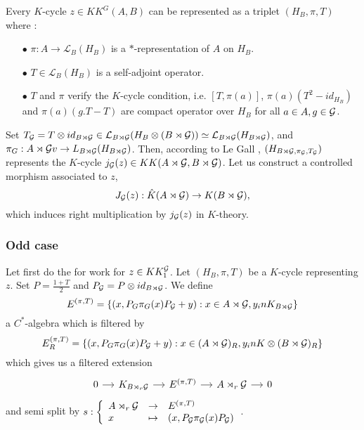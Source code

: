 Every $K$-cycle $z\in KK^G(A,B)$ can be represented as a triplet $(H_B, \pi, T)$ where :
\begin{itemize}
\item[$\bullet$]$\pi : A\rightarrow \mathcal L_B(H_B)$ is a $*$-representation of $A$ on $H_B$.
\item[$\bullet$]$T\in \mathcal L_B(H_B)$ is a self-adjoint operator.
\item[$\bullet$] $T$ and $\pi$ verify the $K$-cycle condition, i.e. $[T,\pi(a)]$, $\pi(a)(T^2-id_{H_B})$ and $\pi(a)(g.T-T)$ are compact operator over $H_B$ for all $a\in A, g\in \mathcal G$.\\
\end{itemize}

Set $T_\mathcal G= T\otimes id_{B\rtimes \mathcal G}\in \mathcal L_{B\rtimes \mathcal G}(H_B\otimes (B\rtimes \mathcal G))\simeq \mathcal L_{B\rtimes \mathcal G}(H_{B\rtimes\mathcal G})$, and $\pi_G: A\rtimes \mathcal G v\rightarrow L_{B\rtimes \mathcal G}(H_{B\rtimes\mathcal G})$. Then, according to Le Gall \cite{LeGall}, $(H_{B\rtimes\mathcal G, \pi_\mathcal G, T_\mathcal G})$ represents the $K$-cycle $j_\mathcal G(z)\in KK(A\rtimes \mathcal G,B\rtimes \mathcal G)$. Let us construct a controlled morphism associated to $z$,
\[J_\mathcal G(z) : \hat K(A\rtimes \mathcal G)\rightarrow K(B\rtimes\mathcal G), \]
which induces right multiplication by $j_\mathcal G(z)$ in $K$-theory.\\

\subsubsection{Odd case}

Let first do the for work for $z\in KK_1^\mathcal G$. Let $(H_B,\pi,T)$ be a $K$-cycle representing $z$. Set $P=\frac{1+T}{2}$ and $P_\mathcal G=P\otimes id_{B\rtimes \mathcal G}$. We define
\[E^{(\pi,T)}=\{(x,P_G\pi_G(x)P_\mathcal G + y) : x\in A\rtimes \mathcal G, y_in K_{B\rtimes\mathcal G}\}\]
a $C^*$-algebra which is filtered by
\[E_R^{(\pi,T)}=\{(x,P_G\pi_G(x)P_\mathcal G + y) : x\in (A\rtimes \mathcal G)_R, y_in K\otimes (B\rtimes\mathcal G)_R\}\]
which gives us a filtered extension
\[\begin{tikzcd}[column sep = small]
0\arrow{r} & K_{B\rtimes_r\G}\arrow{r} & E^{(\pi,T)} \arrow{r} & A\rtimes_r \G \arrow{r}& 0
\end{tikzcd}\]
and semi split by  $s :\left\{\begin{array}{lll}A\rtimes_r \mathcal G & \rightarrow & E^{(\pi,T)} \\ x & \mapsto & (x, P_\mathcal G \pi_\mathcal G(x)P_\mathcal G)\end{array}\right.$.\\


